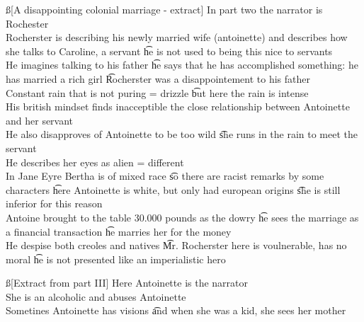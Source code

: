 \documentclass[12pt]{article}
\begin{document}
\ss[A disappointing colonial marriage - extract]
In part two the narrator is Rochester \\
Rocherster is describing his newly married wife (antoinette) and describes how she talks to Caroline, a servant \t he is not used to being this nice to servants \\
He imagines talking to his father \t he says that he has accomplished something: he has married a rich girl \t Rocherster was a disappointement to his father \\
Constant rain that is not puring = drizzle \t but here the rain is intense \\
His british mindset finds inacceptible the close relationship between Antoinette and her servant \\
He also disapproves of Antoinette to be too wild \t she runs in the rain to meet the servant \\
He describes her eyes as alien = different \\
In Jane Eyre Bertha is of mixed race \t so there are racist remarks by some characters \t here Antoinette is white, but only had european origins \t she is still inferior for this reason \\
Antoine brought to the table 30.000 pounds as the dowry \t he sees the marriage as a financial transaction \t he marries her for the money \\
He despise both creoles and natives \t Mr. Rocherster here is voulnerable, has no moral \t he is not presented like an imperialistic hero

\ss[Extract from part III]
Here Antoinette is the narrator \\
She is an alcoholic and abuses Antoinette \\
Sometines Antoinette has visions \t and when she was a kid, she sees her mother \\
\end{document}
